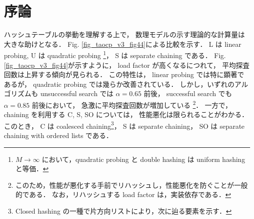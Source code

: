 \chapter{序論}
\label{chap_Introduction}

ハッシュテーブルの挙動を理解する上で，
数理モデルの示す理論的な計算量は大きな助けとなる．
Fig. \ref{fig_taocp_v3_fig44}に\cite{knuth1998}よる比較を示す．
L は linear probing,
U は quadratic probing \footnote{$M \rightarrow \infty$ において，quadratic probing と double hashing は uniform hashing と等価．}，
S は separate chaining である．
Fig. \ref{fig_taocp_v3_fig44}が示すように，
load factor が高くなるにつれて，
平均探査回数は上昇する傾向が見られる．
この特性は，
linear probing では特に顕著であるが，
quadratic probing では幾らか改善されている．
しかし，いずれのアルゴリズムも
unsuccessful search では $\alpha = 0.65$ 前後，
successful search でも $\alpha = 0.85$ 前後において，
急激に平均探査回数が増加している
\footnote{
  このため，性能が悪化する手前でリハッシュし，性能悪化を防ぐことが一般的である．
  なお，リハッシュする load factor は，実装依存である．
}．
一方で，chaining を利用する C, S, SO については，
性能悪化は限られることがわかる．
このとき，
C は coalesced chaining\footnote{Closed hashing の一種で片方向リストにより，次に辿る要素を示す．}，
S は separate chaining，
SO は separate chaining with ordered lists である．




